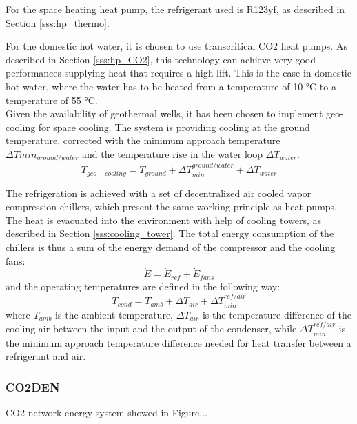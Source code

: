 \documentclass{article}
\begin{document}
For the space heating heat pump, the refrigerant used is R123yf, as described in Section \ref{sss:hp_thermo}.

For the domestic hot water, it is chosen to use transcritical CO2 heat pumps. As described in Section \ref{sss:hp_CO2}, this technology can achieve very good performances supplying heat that requires a high lift. This is the case in domestic hot water, where the water has to be heated from a temperature of 10 \si{\celsius} to a temperature of 55 \si{\celsius}.\\

Given the availability of geothermal wells, it has been chosen to implement geo-cooling for space cooling. The system is providing cooling at the ground temperature, corrected with the minimum approach temperature $\Delta Tmin_{ground/water}$ and the temperature rise in the water loop $\Delta T_{water}$.
\begin{equation}
T_{geo-cooling} = T_{ground} + \Delta T_{min}^{ground/water} + \Delta T_{water}
\end{equation}

The refrigeration is achieved with a set of decentralized air cooled vapor compression chillers, which present the same working principle as heat pumps. The heat is evacuated into the environment with help of cooling towers, as described in Section \ref{sss:cooling_tower}.
The total energy consumption of the chillers is thus a sum of the energy demand of the compressor and the cooling fans:
\begin{equation}
\dot{E} = \dot{E}_{ref} + \dot{E}_{fans}
\end{equation}
and the operating temperatures are defined in the following way:
\begin{equation}
    T_{cond} = T_{amb} + \Delta T_{air} + \Delta T_{min}^{ref/air}
\end{equation}
where $T_{amb}$ is the ambient temperature, $\Delta T_{air}$ is the temperature difference of the cooling air between the input and the output of the condenser, while $\Delta T_{min}^{ref/air}$ is the minimum approach temperature difference needed for heat transfer between a refrigerant and air.\\

\subsubsection{CO2DEN}\label{sss:CO2DEN}
CO2 network energy system showed in Figure...
\end{document}

